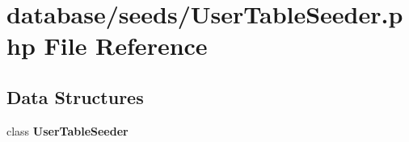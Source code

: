 \section{database/seeds/\+User\+Table\+Seeder.php File Reference}
\label{_user_table_seeder_8php}
\subsection*{Data Structures}
\begin{DoxyCompactItemize}
\item 
class {\bf User\+Table\+Seeder}
\end{DoxyCompactItemize}
